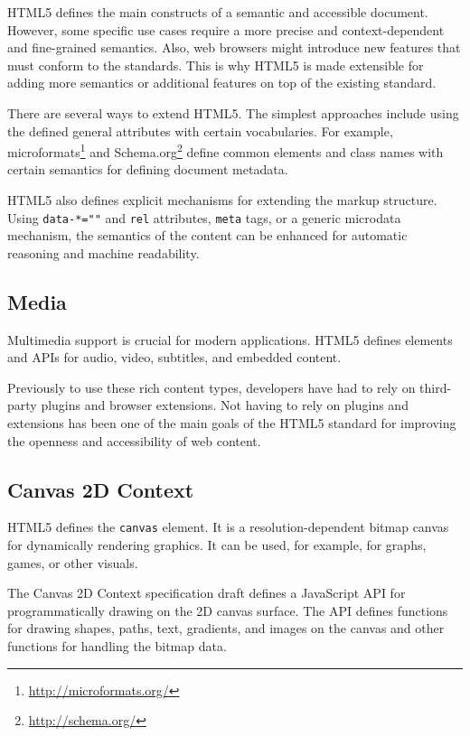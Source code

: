 HTML5 defines the main constructs of a semantic and accessible
document. However, some specific use cases require a more precise and
context-dependent and fine-grained semantics. Also, web browsers might
introduce new features that must conform to the standards. This is why
HTML5 is made extensible for adding more semantics or additional
features on top of the existing standard.

There are several ways to extend HTML5. The simplest approaches
include using the defined general attributes with certain
vocabularies. For example,
microformats\footnote{\url{http://microformats.org/}} and
Schema.org\footnote{\url{http://schema.org/}} define common elements
and class names with certain semantics for defining document metadata.

HTML5 also defines explicit mechanisms for extending the markup
structure. Using \texttt{data-*=""} and \texttt{rel} attributes,
\texttt{meta} tags, or a generic microdata mechanism, the semantics of
the content can be enhanced for automatic reasoning and machine
readability. \cite{HTML5draft}

\subsection{Media}

Multimedia support is crucial for modern applications. HTML5 defines
elements and APIs for audio, video, subtitles, and embedded content.

Previously to use these rich content types, developers have had to
rely on third-party plugins and browser extensions. Not having to rely
on plugins and extensions has been one of the main goals of the HTML5
standard for improving the openness and accessibility of web content.

\subsection{Canvas 2D Context}

HTML5 defines the \texttt{canvas} element. It is a
resolution-dependent bitmap canvas for dynamically rendering
graphics. It can be used, for example, for graphs, games, or other
visuals. \cite{HTML5draft}

The Canvas 2D Context specification draft \cite{canvas2Ddraft} defines
a JavaScript API for programmatically drawing on the 2D canvas
surface. The API defines functions for drawing shapes, paths, text,
gradients, and images on the canvas and other functions for handling
the bitmap data.

